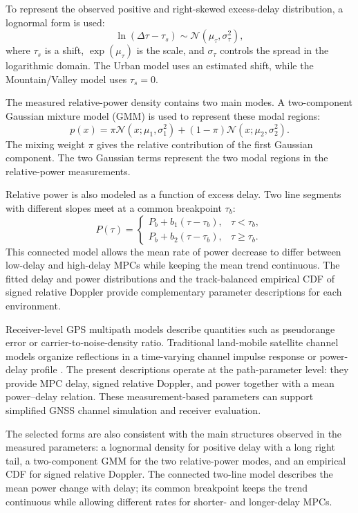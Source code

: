 \documentclass[conference]{IEEEtran}
\begin{document}
To represent the observed positive and right-skewed excess-delay distribution, a lognormal form is used:
\begin{equation}
\ln(\Delta\tau-\tau_s)\sim\mathcal N(\mu_\tau,\sigma_\tau^2),
\label{eq:lognormal}
\end{equation}
where $\tau_s$ is a shift, $\exp(\mu_\tau)$ is the scale, and $\sigma_\tau$ controls the spread in the logarithmic domain. The Urban model uses an estimated shift, while the Mountain/Valley model uses $\tau_s=0$.

The measured relative-power density contains two main modes. A two-component Gaussian mixture model (GMM) is used to represent these modal regions:
\begin{equation}
p(x)=\pi\mathcal N(x;\mu_1,\sigma_1^2)
+(1-\pi)\mathcal N(x;\mu_2,\sigma_2^2).
\label{eq:gmm2}
\end{equation}
The mixing weight $\pi$ gives the relative contribution of the first Gaussian component. The two Gaussian terms represent the two modal regions in the relative-power measurements.

Relative power is also modeled as a function of excess delay. Two line segments with different slopes meet at a common breakpoint $\tau_b$:
\begin{equation}
P(\tau)=
\begin{cases}
P_b+b_1(\tau-\tau_b), & \tau<\tau_b,\\
P_b+b_2(\tau-\tau_b), & \tau\ge\tau_b.
\end{cases}
\label{eq:piecewise}
\end{equation}
This connected model allows the mean rate of power decrease to differ between low-delay and high-delay MPCs while keeping the mean trend continuous. The fitted delay and power distributions and the track-balanced empirical CDF of signed relative Doppler provide complementary parameter descriptions for each environment.

Receiver-level GPS multipath models describe quantities such as pseudorange error or carrier-to-noise-density ratio. Traditional land-mobile satellite channel models organize reflections in a time-varying channel impulse response or power-delay profile \cite{lehner2005lms}. The present descriptions operate at the path-parameter level: they provide MPC delay, signed relative Doppler, and power together with a mean power--delay relation. These measurement-based parameters can support simplified GNSS channel simulation and receiver evaluation.

The selected forms are also consistent with the main structures observed in the measured parameters: a lognormal density for positive delay with a long right tail, a two-component GMM for the two relative-power modes, and an empirical CDF for signed relative Doppler. The connected two-line model describes the mean power change with delay; its common breakpoint keeps the trend continuous while allowing different rates for shorter- and longer-delay MPCs.
\end{document}
